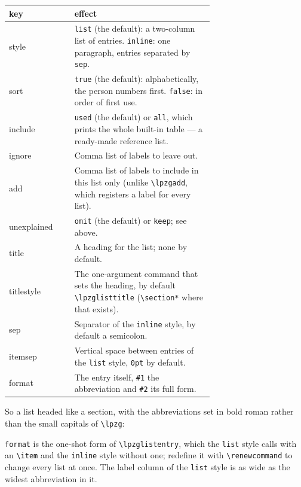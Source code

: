 \documentclass[11pt,a4paper]{article}
\newcommand{\cs}[1]{\texttt{\textbackslash #1}}
\begin{document}
\medskip
\noindent
\begin{tabular}{@{}>{\ttfamily}l p{0.68\linewidth}@{}}
\toprule
\normalfont key & \normalfont effect \\
\midrule
style & \texttt{list} (the default): a two-column list of entries.
  \texttt{inline}: one paragraph, entries separated by \texttt{sep}. \\
sort & \texttt{true} (the default): alphabetically, the person numbers
  first. \texttt{false}: in order of first use. \\
include & \texttt{used} (the default) or \texttt{all}, which prints the
  whole built-in table --- a ready-made reference list. \\
ignore & Comma list of labels to leave out. \\
add & Comma list of labels to include in this list only (unlike
  \cs{lpzgadd}, which registers a label for every list). \\
unexplained & \texttt{omit} (the default) or \texttt{keep}; see above. \\
title & A heading for the list; none by default. \\
titlestyle & The one-argument command that sets the heading, by default
  \cs{lpzglisttitle} (\cs{section*} where that exists). \\
sep & Separator of the \texttt{inline} style, by default a semicolon. \\
itemsep & Vertical space between entries of the \texttt{list} style,
  \texttt{0pt} by default. \\
format & The entry itself, \texttt{\#1} the abbreviation and
  \texttt{\#2} its full form. \\
\bottomrule
\end{tabular}
\medskip

\noindent So a list headed like a section, with the abbreviations set in
bold roman rather than the small capitals of \cs{lpzg}:

\begin{code}
\lpzglist[title=Abbreviations,
          format={\item[\textbf{#1}] #2}]
\end{code}

\noindent \texttt{format} is the one-shot form of \cs{lpzglistentry},
which the \texttt{list} style calls with an \cs{item} and the
\texttt{inline} style without one; redefine it with \cs{renewcommand} to
change every list at once. The label column of the \texttt{list} style is
as wide as the widest abbreviation in it.
\end{document}
